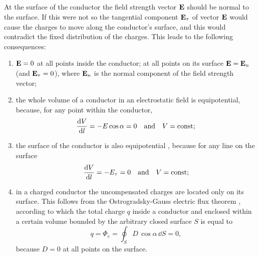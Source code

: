 \subsection{}\label{16.4.3} At the surface of the conductor the field strength vector $\vb{E}$ should be normal to the surface. If this were not so the tangential component $\vb{E}_{\tau}$ of vector $\vb{E}$ would cause the charges to move along the conductor's surface, and this would contradict the fixed distribution of the charges. This leads to the following consequences:
\begin{enumerate}[label=(\alph*)]
\item $\vb{E} = 0$ at all points inside the conductor; at all points on its surface $\vb{E} = \vb{E}_{n}$ (and $\vb{E}_{\tau} = 0$), where $\vb{E}_{n}$ is the normal component of the field strength vector;
\item the whole volume of a conductor in an electrostatic field is equipotential, because, for any point within the conductor,
\begin{equation*}%
\dv{V}{l} = - E \cos \alpha = 0 \qand V = \text{const;}
\end{equation*}
\item the surface of the conductor is also equipotential , because for any line on the surface
\begin{equation*}%
\dv{V}{l} = - E_{\tau} = 0 \qand V = \text{const;}
\end{equation*}
\item in a charged conductor the uncompensated charges are located only on its surface. This follows from the Ostrogradsky-Gauss electric flux theorem , according to which the total charge $q$ inside a conductor and enclosed within a certain volume bounded by the arbitrary closed surface $S$ is equal to
\begin{equation*}%
q = \Phi_{e} = \oint_{S} D \, \cos \alpha \, \dd S = 0,
\end{equation*}
because $D = 0$ at all points on the surface.
\end{enumerate}

